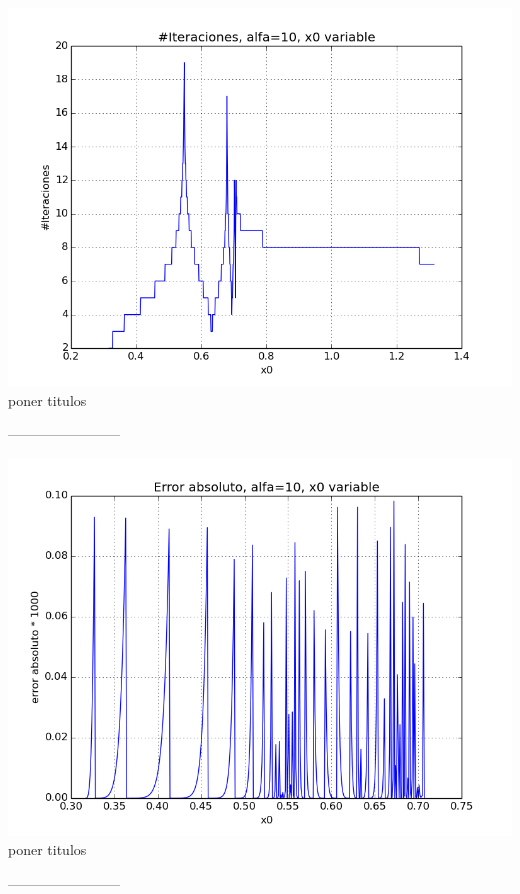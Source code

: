 \begin{center}
\includegraphics[scale=0.5]{graficos/iteraciones-e-newton-alfa_fijo-absoluto-0.0001-alejando.png}\\
poner titulos
\end{center}
------------------------
\begin{center}
\includegraphics[scale=0.5]{graficos/x0s-e-newton-alfa_fijo-absoluto-0.0001-alejando.png}\\
poner titulos
\end{center}
------------------------
